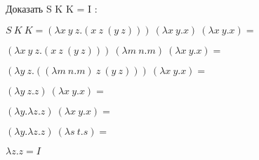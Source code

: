 \documentclass[12pt]{article}
\begin{document}
Доказать S K K = I : \newline 

$ S\:K\:K = (\lambda x\:y\:z.(x\:z\:(y\:z)) )\: (\lambda x\:y.x) \: (\lambda x\:y.x)  = $ \newline 

$ (\lambda x\:y\:z.(x\:z\:(y\:z))) \: (\lambda m\:n.m) \: (\lambda x\:y.x)  = $ \newline 

$ (\lambda y\:z.((\lambda m\:n.m )\:z\:(y\:z))) \:  (\lambda x\:y.x)  = $ \newline 

$ (\lambda y\:z.z) \:  (\lambda x\:y.x)  = $ \newline 

$ (\lambda y.\lambda z.z) \:  (\lambda x\:y.x)  = $ \newline 

$ (\lambda y.\lambda z.z) \:  (\lambda s\:t.s)  = $ \newline 

$ \lambda z.z = I$ \newline 
\end{document}
